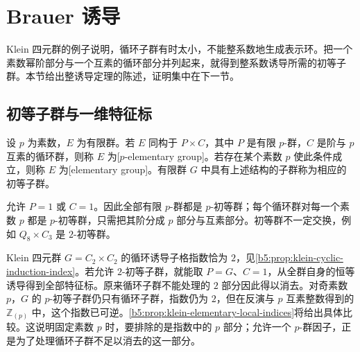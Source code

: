 
\section{Brauer 诱导}
\label{b5:sec:0503}

Klein 四元群的例子说明，循环子群有时太小，不能整系数地生成表示环。把一个素数幂阶部分与一个互素的循环部分并列起来，就得到整系数诱导所需的初等子群。本节给出整诱导定理的陈述，证明集中在下一节。

\subsection{初等子群与一维特征标}
\label{b5:subsec:0503:01}

\begin{definition}\label{b5:def:elementary-group}
	设 \(p\) 为素数，\(E\) 为有限群。若 \(E\) 同构于 \(P\times C\)，其中 \(P\) 是有限 \(p\)-群，\(C\) 是阶与 \(p\) 互素的循环群，则称 \(E\) 为[\(p\)-elementary group]。若存在某个素数 \(p\) 使此条件成立，则称 \(E\) 为[elementary group]。有限群 \(G\) 中具有上述结构的子群称为相应的初等子群。
\end{definition}

允许 \(P=1\) 或 \(C=1\)。因此全部有限 \(p\)-群都是 \(p\)-初等群；每个循环群对每一个素数 \(p\) 都是 \(p\)-初等群，只需把其阶分成 \(p\) 部分与互素部分。初等群不一定交换，例如 \(Q_8\times C_3\) 是 \(2\)-初等群。

\ProseParagraphBreak
Klein 四元群 \(G=C_2\times C_2\) 的循环诱导子格指数恰为 \(2\)，见\cref{b5:prop:klein-cyclic-induction-index}。若允许 \(2\)-初等子群，就能取 \(P=G\)、\(C=1\)，从全群自身的恒等诱导得到全部特征标。原来循环子群不能处理的 \(2\) 部分因此得以消去。对奇素数 \(p\)，\(G\) 的 \(p\)-初等子群仍只有循环子群，指数仍为 \(2\)，但在反演与 \(p\) 互素整数得到的 \(\mathbb Z_{(p)}\) 中，这个指数已可逆。\cref{b5:prop:klein-elementary-local-indices}将给出具体比较。这说明固定素数 \(p\) 时，要排除的是指数中的 \(p\) 部分；允许一个 \(p\)-群因子，正是为了处理循环子群不足以消去的这一部分。

